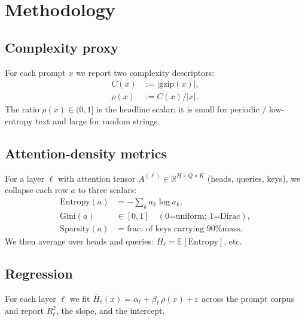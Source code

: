 \section{Methodology}
\subsection{Complexity proxy}
For each prompt $x$ we report two complexity descriptors:
\begin{align}
C(x) &:= |\text{gzip}(x)|,\\
\rho(x) &:= C(x)/|x|.
\end{align}
The ratio $\rho(x) \in (0,1]$ is the headline scalar; it is small for
periodic / low-entropy text and large for random strings.

\subsection{Attention-density metrics}
For a layer $\ell$ with attention tensor
$A^{(\ell)}\in\mathbb{R}^{H\times Q\times K}$ (heads, queries, keys), we
collapse each row $a$ to three scalars:
\begin{align}
\mathrm{Entropy}(a) &= -\textstyle\sum_k a_k\log a_k,\\
\mathrm{Gini}(a) &\in [0,1] \quad(\text{0=uniform; 1=Dirac}),\\
\mathrm{Sparsity}(a) &= \text{frac.\ of keys carrying 90\% mass}.
\end{align}
We then average over heads and queries:
$\overline{H}_\ell = \mathbb{E}[\mathrm{Entropy}]$, etc.

\subsection{Regression}
For each layer $\ell$ we fit
$\overline{H}_\ell(x) = \alpha_\ell + \beta_\ell\,\rho(x) + \varepsilon$
across the prompt corpus and report $R^2_\ell$, the slope, and the
intercept.
